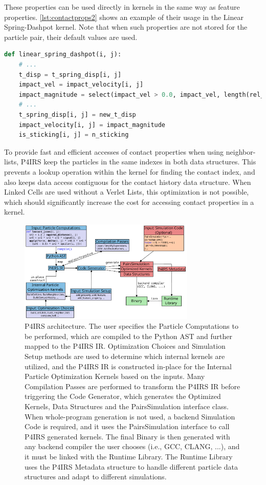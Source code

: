 \documentclass[Afour,sageh,times]{sagej}
\newcommand{\RMchange}[1]{{\color{blue} #1}}
\begin{document}
These properties can be used directly in kernels in the same way as feature properties.
\autoref{lst:contactprops2} shows an example of their usage in the Linear Spring-Dashpot kernel.
Note that when such properties are not stored for the particle pair, their default values are used.

\begin{lstlisting}[language=Python,
		   label={lst:contactprops2},
		   caption={Contact properties usage example.}]
def linear_spring_dashpot(i, j):
    # ...
    t_disp = t_spring_disp[i, j]
    impact_vel = impact_velocity[i, j]
    impact_magnitude = select(impact_vel > 0.0, impact_vel, length(rel_vel))
    # ...
    t_spring_disp[i, j] = new_t_disp
    impact_velocity[i, j] = impact_magnitude
    is_sticking[i, j] = n_sticking
\end{lstlisting}

To provide fast and efficient accesses of contact properties when using neighbor-lists, P4IRS keep the particles in the same indexes in both data structures.
This prevents a lookup operation within the kernel for finding the contact index, and also keeps data access contiguous for the contact history data structure.
When Linked Cells are used without a Verlet Lists, this optimization is not possible, which should significantly increase the cost for accessing contact properties in a kernel.

\begin{figure}[htb]
  \centering
  \includegraphics[width=0.75\textwidth]{pairs_architecture.pdf}
  \caption{\RMchange{P4IRS architecture. The user specifies the Particle Computations to be performed, which are compiled to the Python AST and further mapped to the P4IRS IR. Optimization Choices and Simulation Setup methods are used to determine which internal kernels are utilized, and the P4IRS IR is constructed in-place for the Internal Particle Optimization Kernels based on the inputs. Many Compilation Passes are performed to transform the P4IRS IR before triggering the Code Generator, which generates the Optimized Kernels, Data Structures and the PairsSimulation interface class. When whole-program generation is not used, a backend Simulation Code is required, and it uses the PairsSimulation interface to call P4IRS generated kernels. The final Binary is then generated with any backend compiler the user chooses (i.e., GCC, CLANG, ...), and it must be linked with the Runtime Library. The Runtime Library uses the P4IRS Metadata structure to handle different particle data structures and adapt to different simulations.}}
  \label{fig:pairs_arch}
\end{figure}
\end{document}
